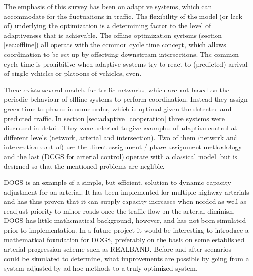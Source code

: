 \label{sec:conclusion}

The emphasis of this survey has been on adaptive systems, which can
accommodate for the fluctuations in traffic.  The flexibility of the
model (or lack of) underlying the optimization is a determining factor
to the level of adaptiveness that is achievable. The offline
optimization systems (section \ref{sec:offline}) all operate with the
common cycle time concept, which allows coordination to be set up by
offsetting downstream intersections. The common cycle time is
prohibitive when adaptive systems try to react to (predicted) arrival
of single vehicles or platoons of vehicles, even.

There exists several models for traffic networks, which are not based
on the periodic behaviour of offline systems to perform
coordination. Instead they assign green time to phases in some order,
which is optimal given the detected and predicted traffic.  In section
\ref{sec:adaptive_cooperation} three systems were discussed in
detail. They were selected to give examples of adaptive control at
different levels (network, arterial and intersection). Two of them
(network and intersection control) use the direct assignment / phase
assignment methodology and the last (DOGS for arterial control)
operate with a classical model, but is designed so that the mentioned
problems are neglible.

DOGS is an example of a simple, but efficient, solution to dynamic
capacity adjustment for an arterial. It has been implemented for
multiple highway arterials and has thus proven that it can supply
capacity increases when needed as well as readjust priority to minor
roads once the traffic flow on the arterial diminish.  DOGS has little
mathematical background, however, and has not been simulated prior to
implementation.  In a future project it would be interesting to
introduce a mathematical foundation for DOGS, preferably on the basis
on some established arterial progression scheme such as
REALBAND. Before and after scenarios could be simulated to determine,
what improvements are possible by going from a system adjusted by
ad-hoc methods to a truly optimized system.
